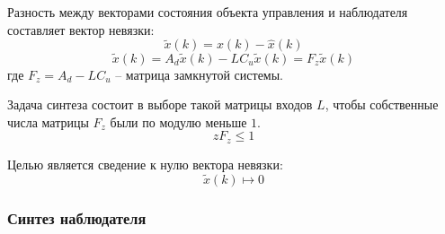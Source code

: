 \documentclass[a4paper,14pt]{extreport}
\begin{document}
	Разность между векторами состояния объекта управления и наблюдателя составляет вектор невязки:
	\begin{equation}
		\tilde{x} (k) = x(k) - \hat{x} (k)
	\end{equation}
	\begin{equation}
		\tilde{x} (k) = A_d \tilde{x} (k) - L C_u \tilde{x} (k) = F_z \tilde{x} (k)
	\end{equation}
	где $F_z = A_d - L C_u$ -- матрица замкнутой системы.
	
	Задача синтеза состоит в выборе такой матрицы входов $L$, чтобы
	собственные числа матрицы $F_z$ были по модулю меньше $1$.
	\begin{equation}
		z{F_z} \le 1
	\end{equation}

	Целью является сведение к нулю вектора невязки:
	\begin{equation}
		\tilde{x} (k) \mapsto 0
	\end{equation}	
	
	\subsubsection{Синтез наблюдателя}
	
\end{document}
